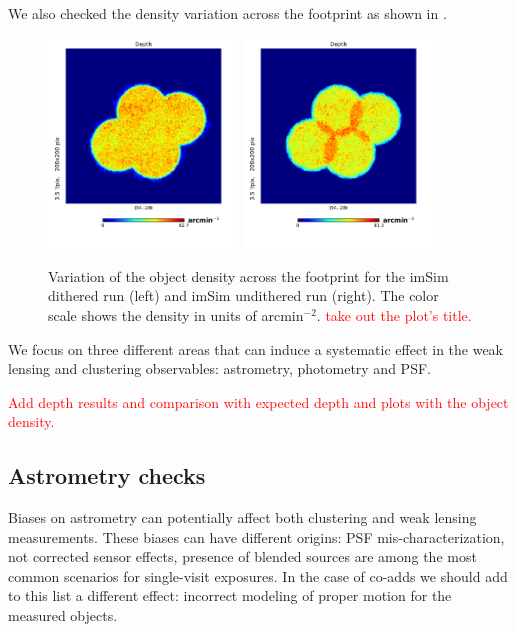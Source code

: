 \documentclass[\docopts]{\docclass}
\begin{document}
We also checked the density variation across the footprint as shown in .

\begin{figure}
  \centering
  \includegraphics[width=0.45\textwidth]{density_map_dithered}
  \includegraphics[width=0.45\textwidth]{density_map_undithered}
  \caption{Variation of the object density across the footprint for the imSim dithered run (left) and imSim undithered run
  (right). The color scale shows the density in units of arcmin$^{-2}$. \textcolor{red}{take out the plot's title.}}
  \label{fig:density_footprint}
\end{figure}

We focus on three different areas that can induce a systematic effect in the weak lensing and clustering observables:
astrometry, photometry and PSF.


\textcolor{red}{Add depth results and comparison with expected depth and plots with the object density.}

\subsection{Astrometry checks}
\label{sec:astrometry_checks}

Biases on astrometry can potentially affect both clustering and weak lensing measurements. These biases
can have different origins: PSF mis-characterization, not corrected sensor effects, presence of blended sources are among
the most common scenarios for single-visit exposures. In the case of co-adds we should add to this list a different effect:
incorrect modeling of proper motion for the measured objects.
\end{document}
